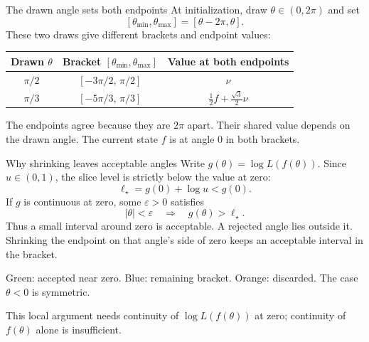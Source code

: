 \documentclass[aspectratio=169,11pt]{beamer}
\begin{document}
\begin{frame}{The drawn angle sets both endpoints}
  At initialization, draw \(\theta\in(0,2\pi)\) and set
  \[
    [\theta_{\min},\theta_{\max}]=[\theta-2\pi,\theta].
  \]
  These two draws give different brackets and endpoint values:
  \begin{center}
    \renewcommand{\arraystretch}{1.55}
    \begin{tabular}{@{}ccc@{}}
      \toprule
      Drawn \(\theta\) & Bracket \([\theta_{\min},\theta_{\max}]\)
        & Value at both endpoints\\
      \midrule
      \(\pi/2\) & \([-3\pi/2,\,\pi/2]\) & \(\nu\)\\
      \(\pi/3\) & \([-5\pi/3,\,\pi/3]\)
        & \(\tfrac12 f+\tfrac{\sqrt3}{2}\nu\)\\
      \bottomrule
    \end{tabular}
  \end{center}
  The endpoints agree because they are \(2\pi\) apart.
  Their shared value depends on the drawn angle.
  The current state \(f\) is at angle \(0\) in both brackets.
\end{frame}

\begin{frame}{Why shrinking leaves acceptable angles}
  Write \(g(\theta)=\log L(f(\theta))\).
  Since \(u\in(0,1)\), the slice level is strictly below the value at zero:
  \[
    \ell_\star=g(0)+\log u<g(0).
  \]
  If \(g\) is continuous at zero, some \(\varepsilon>0\) satisfies
  \[
    |\theta|<\varepsilon
      \quad\Longrightarrow\quad g(\theta)>\ell_\star.
  \]
  Thus a small interval around zero is acceptable.
  A rejected angle lies outside it. Shrinking the endpoint on that
  angle's side of zero keeps an acceptable interval in the bracket.
  \vspace{0.25em}
  \begin{center}
  \end{center}
  {\footnotesize Green: accepted near zero. Blue: remaining bracket.
  Orange: discarded. The case \(\theta<0\) is symmetric.}
  \vspace{0.15em}

  {\footnotesize This local argument needs continuity of
  \(\log L(f(\theta))\) at zero; continuity of \(f(\theta)\) alone is
  insufficient.}
\end{frame}
\end{document}
